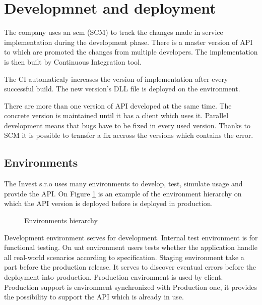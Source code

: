 \section{Developmnet and deployment}
The company uses an \gls{scm} (SCM) to track the changes made in service implementation during the development phase. There is a master version of API to which are promoted the changes from multiple developers. The implementation is then built by Continuous Integration tool. 

The CI automaticaly increases the version of implementation after every successful build. The new version's DLL file is deployed on the environment. 

There are more than one version of API developed at the same time. The concrete version is maintained until it has a client which uses it. Parallel development means that bugs have to be fixed in every used version. Thanks to SCM it is possible to transfer a fix accross the versions which contains the error. 

\subsection{Environments}
The Invest s.r.o uses many environments to develop, test, simulate usage and provide the API. On Figure \ref{fig:environments-hierarchy} is an example of the environment hierarchy on which the API version is deployed before is deployed in production.

\begin{figure}[htp] 
\caption{Environments hierarchy}
\label{fig:environments-hierarchy}
\end{figure} 

Development environment serves for development. Internal test environment is for functional testing. On \gls{uat} environment users tests whether the application handle all real-world scenarios according to specification. Staging environment take a part before the production release. It serves to discover eventual errors before the deployment into production. Production environment is used by client. Production support is environment synchronized with Production one, it provides the possibility to support the API which is already in use.

